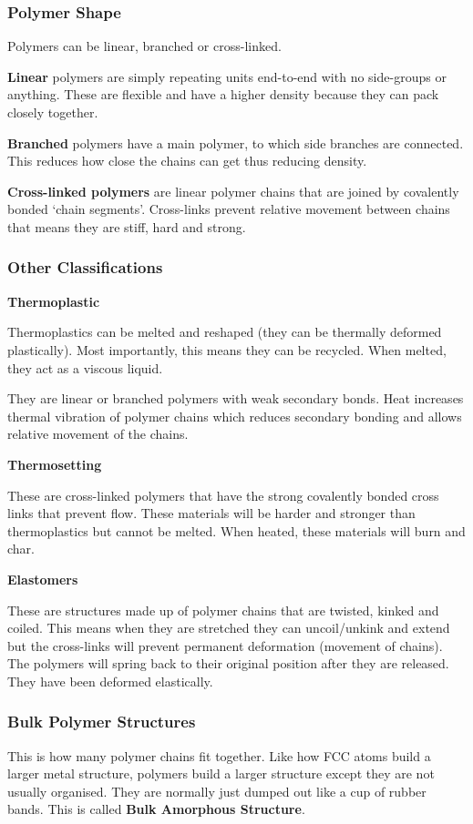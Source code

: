 \documentclass[12pt]{article}
\begin{document}
\subsubsection{Polymer Shape}
Polymers can be linear, branched or cross-linked.

\textbf{Linear}
polymers are simply repeating units end-to-end with no side-groups or anything.
These are flexible and have a higher density because they can pack closely together.

\textbf{Branched}
polymers have a main polymer, to which side branches are connected.
This reduces how close the chains can get thus reducing density.

\textbf{Cross-linked polymers}
are linear polymer chains that are joined by covalently bonded `chain segments'.
Cross-links prevent relative movement between chains that means they are stiff, hard and strong. 

\subsubsection{Other Classifications}
\textbf{Thermoplastic}

Thermoplastics can be melted and reshaped (they can be thermally deformed plastically).
Most importantly, this means they can be recycled.
When melted, they act as a viscous liquid.

They are linear or branched polymers with weak secondary bonds.
Heat increases thermal vibration of polymer chains which reduces secondary bonding and allows relative movement of the chains.

\textbf{Thermosetting}

These are cross-linked polymers that have the strong covalently bonded cross links that prevent flow. 
These materials will be harder and stronger than thermoplastics but cannot be melted.
When heated, these materials will burn and char. 

\textbf{Elastomers} 

These are structures made up of polymer chains that are twisted, kinked and coiled.
This means when they are stretched they can uncoil/unkink and extend but the cross-links will prevent permanent deformation (movement of chains).
The polymers will spring back to their original position after they are released. 
They have been deformed elastically.

\subsubsection{Bulk Polymer Structures}
This is how many polymer chains fit together. 
Like how FCC atoms build a larger metal structure, polymers build a larger structure except they are not usually organised.
They are normally just dumped out like a cup of rubber bands. 
This is called \textbf{Bulk Amorphous Structure}.
\end{document}
